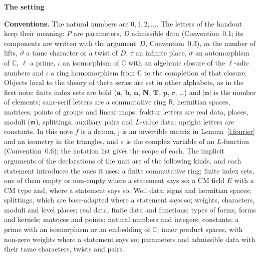 \documentclass[11pt,a4paper]{article}
\newcommand{\sect}[2]{\refstepcounter{section}\label{#2}\par\addvspace{19pt plus 4pt minus 2pt}\Needspace{7\baselineskip}%
  \noindent\llap{{\fontsize{13.2}{16}\selectfont\bfseries\color{inkfaint}\thesection}\hspace{9pt}}%
  {\fontsize{13.2}{16}\selectfont\bfseries\color{ink}#1}\par\nopagebreak\vspace{-1pt}}
\theoremstyle{plainx}
\theoremstyle{uprightx}
\newenvironment{conventions}{\par\addvspace{5pt}\noindent\textbf{Conventions.}\enspace\ignorespaces}{\par\addvspace{3pt}}
\newcommand{\sR}{\mathsf{R}}
\newcommand{\ba}{\mathbf{a}}
\newcommand{\bb}{\mathbf{b}}
\newcommand{\bn}{\mathbf{n}}
\newcommand{\br}{\mathbf{r}}
\newcommand{\bp}{\mathbf{p}}
\newcommand{\bN}{\mathbf{N}}
\newcommand{\bT}{\mathbf{T}}
\newcommand{\fm}{\mathfrak{m}}
\newcommand{\CC}{\mathbb{C}}
\begin{document}
\sect{The setting}{s:setting}
\begin{conventions}\label{c:conventions}
The natural numbers are $0,1,2,\dots$. The letters of the handout keep their meaning: $P$ are parameters, $D$
admissible data (Convention~0.1; its components are written with the argument~$D$, Convention~0.3), $m$ the number of lifts, $\vartheta$ a tame character or a twist of $D$, $\tau$ an infinite
place, $\sigma$ an automorphism of $\CC$, $\ell$ a prime, $\iota$ an isomorphism of $\CC$ with an algebraic closure
of the $\ell$-adic numbers and $\iota$ a ring homomorphism from $\CC$ to the completion of that closure. Objects local
to the theory of theta series are set in other alphabets, as in the first note: finite index sets are bold
($\ba$, $\bb$, $\bn$, $\bN$, $\bT$, $\bp$, $\br$, \dots) and $|\bn|$ is the number of elements; sans-serif letters
are a commutative ring $\sR$, hermitian spaces, matrices, points of groups and linear maps; fraktur letters are
real data, places, moduli ($\fm$), splittings, auxiliary pairs and $L$-value data; upright letters are constants.
In this note $f$ is a datum, $\mathsf{j}$ is an invertible matrix in Lemma~\ref{l:fourier} and an isometry in the triangles,
and $s$ is the complex variable of an $L$-function (Convention~0.6); the notation list gives the scope of each.
The implicit arguments of the declarations of the unit are of the following kinds, and each statement introduces
the ones it uses: a finite commutative ring; finite index sets, one of them empty or non-empty where a statement
says so; a CM field $E$ with a CM type and, where a statement says so, Weil data; signs and hermitian spaces;
splittings, which are base-adapted where a statement says so; weights, characters, moduli and level places; real
data, finite data and functions; types of forms, forms and kernels; matrices and points; natural numbers and
integers; constants; a prime with an isomorphism or an embedding of $\CC$; inner product spaces, with non-zero
weights where a statement says so; parameters and admissible data with their tame characters, twists and pairs.
\end{conventions}
\end{document}
